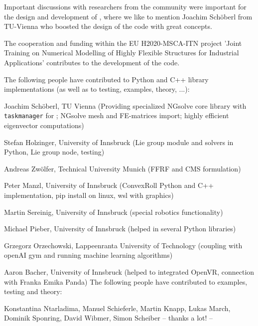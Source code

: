 Important discussions with researchers from the community were important for the design and development of \codeName , where we like to mention Joachim Sch{\"o}berl from TU-Vienna who boosted the design of the code with great concepts. 

The cooperation and funding within the EU H2020-MSCA-ITN project 'Joint Training on Numerical Modelling of Highly Flexible Structures for Industrial Applications' contributes to the development of the code.

The following people have contributed to Python and C++ library implementations (as well as to testing, examples, theory, ...):
\bi
  \item Joachim Sch{\"o}berl, TU Vienna (Providing specialized NGsolve \cite{Schoeberl1997,NGsolve2014,NGsolve2022} core library with \texttt{taskmanager} for ; NGsolve mesh and FE-matrices import; highly efficient eigenvector computations)
  \item Stefan Holzinger, University of Innsbruck (Lie group module and solvers in Python, Lie group node, testing)
  \item Andreas Zw{\"o}lfer, Technical University Munich (FFRF and CMS formulation)
  \item Peter Manzl, University of Innsbruck (ConvexRoll Python and C++ implementation, pip install on linux, wsl with graphics)
  \item Martin Sereinig, University of Innsbruck (special robotics functionality)
  \item Michael Pieber, University of Innsbruck (helped in several Python libraries)
  \item Grzegorz Orzechowski, Lappeenranta University of Technology (coupling with openAI gym and running machine learning algorithms)
  \item Aaron Bacher, University of Innsbruck (helped to integrated OpenVR, connection with Franka Emika Panda)
\ei
The following people have contributed to examples, testing and theory:
\bi
  \item Konstantina Ntarladima, Manuel Schieferle, Martin Knapp, Lukas March, Dominik Sponring, David Wibmer, Simon Scheiber
\ei
-- thanks a lot! --
%
\newpage
{}
%

